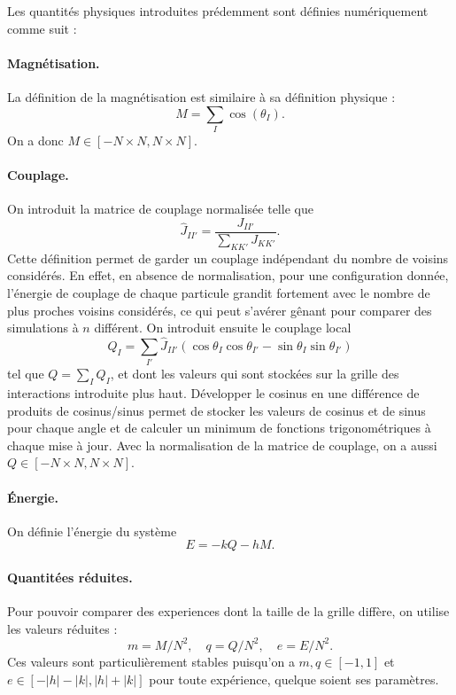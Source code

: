 \documentclass[a4paper, openany, 11pt]{article}
\begin{document}
Les quantités physiques introduites prédemment sont définies numériquement comme suit :
\paragraph{Magnétisation.}
La définition de la magnétisation est similaire à sa définition physique : 
\[
M = \sum_I \cos(\theta_I).
\] On a donc $M \in [-N\times N, N \times N]$.
\paragraph{Couplage.}
On introduit la matrice de couplage normalisée telle que
\begin{equation*}
    \hat{J}_{II'} = \frac{J_{II'}}{\sum_{KK'} J_{KK'} }.
\end{equation*}
Cette définition permet de garder un couplage indépendant du nombre de voisins considérés.  En
effet, en absence de normalisation, pour une configuration donnée, l'énergie de couplage de chaque
particule grandit fortement avec le nombre de plus proches voisins considérés, ce qui peut s'avérer
gênant pour comparer des simulations à $n$ différent.  On introduit ensuite le couplage local 
\begin{equation*}
    Q_I = \sum_{I'} \hat{J}_{II'} ( \cos \theta_I \cos \theta_{I'}  -
    \sin \theta_I \sin \theta_{I'} )
\end{equation*}
tel que $Q = \sum_I Q_I$, et dont les valeurs qui sont stockées sur la grille des interactions
introduite plus haut. Développer le cosinus en une différence de produits de cosinus/sinus permet de
stocker les valeurs de cosinus et de sinus pour chaque angle et de calculer un minimum de fonctions
trigonométriques à chaque mise à jour. Avec la normalisation de la matrice de couplage, on a aussi
$Q \in [-N\times N, N \times N]$.
\paragraph{Énergie.} On définie l'énergie du système 
\begin{equation*}
    E = -k Q - h M.
\end{equation*}

\paragraph{Quantitées réduites.} Pour pouvoir comparer des experiences dont la taille de la grille
diffère, on utilise les valeurs réduites :
\begin{equation*}
    m = M / N^2, \quad q = Q / N^2, \quad e = E / N^2.
\end{equation*}
Ces valeurs sont particulièrement stables puisqu'on a $m,q \in [-1, 1]$ et $e \in [-|h|-|k|,
|h|+|k|]$ pour toute expérience, quelque soient ses paramètres. 
\end{document}
